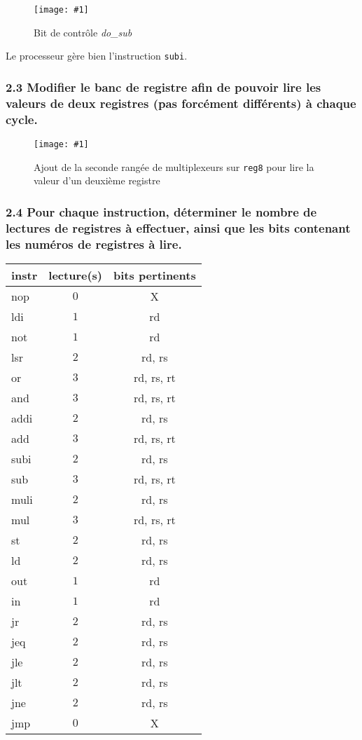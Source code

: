 \documentclass[twoside, 12pt, a4paper]{article}
\newcommand{\cf}[3]{
    \begin{figure}[!hbt]
        \centering
        \texttt{[image: \#1]}
    \caption{#3}\label{Fig:#1}
    \end{figure}
}
\newcommand{\hcf}[2]{\cf{#1}{.75}{#2}}
\begin{document}
    \hcf{do_sub.png}{Bit de contrôle \textit{do\_sub}}
    Le processeur gère bien l'instruction \texttt{subi}.
        
        \subsubsection*{\textbf{2.3} Modifier le banc de registre afin de pouvoir lire les valeurs de deux registres (pas forcément différents) à chaque cycle.}

    \hcf{mod_reg8.png}{Ajout de la seconde rangée de multiplexeurs sur \texttt{reg8} pour lire la valeur d'un deuxième registre}

        \subsubsection*{\textbf{2.4} Pour chaque instruction, déterminer le nombre de lectures de registres à effectuer, ainsi que les bits contenant les numéros de registres à lire.}

\begin{center}
	\ttfamily
	\begin{tabular}{|l|c|c|}
		\hline
		instr    & lecture(s) & bits pertinents \\
		\hline
		nop		&  $0$          & X \\
		ldi		&  $1$          & rd \\
		\hline
		not		&  $1$          & rd \\
		lsr		&  $2$          & rd, rs \\
		or		&  $3$          & rd, rs, rt \\
		and		&  $3$          & rd, rs, rt \\
		\hline
		addi	&  $2$          & rd, rs \\
		add		&  $3$          & rd, rs, rt \\
		subi	&  $2$          & rd, rs \\
		sub		&  $3$          & rd, rs, rt \\
		\hline
		muli	&  $2$          & rd, rs \\
		mul		&  $3$          & rd, rs, rt \\
		\hline
		st		&  $2$          & rd, rs \\
		ld		&  $2$          & rd, rs \\
		out		&  $1$          & rd \\
		in		&  $1$          & rd \\
		\hline
		jr		&  $2$          & rd, rs \\
		\hline
		jeq		&  $2$          & rd, rs \\
		jle		&  $2$          & rd, rs \\
		jlt		&  $2$          & rd, rs \\
		jne		&  $2$          & rd, rs \\
		\hline
		jmp		&  $0$          & X \\
		\hline
	\end{tabular}
\end{center}
\end{document}
